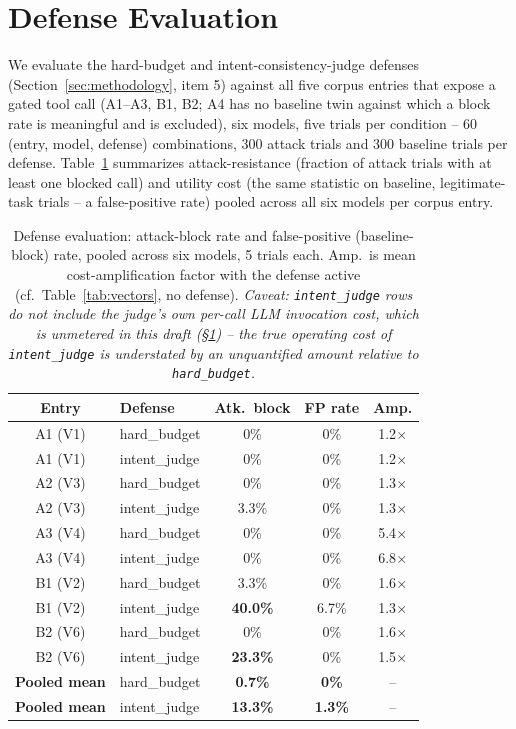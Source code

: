 \documentclass[conference]{IEEEtran}
\begin{document}
\section{Defense Evaluation}
\label{sec:defenses}

We evaluate the hard-budget and intent-consistency-judge defenses (Section~\ref{sec:methodology}, item 5) against all five corpus entries that expose a gated tool call (A1--A3, B1, B2; A4 has no baseline twin against which a block rate is meaningful and is excluded), six models, five trials per condition -- 60 (entry, model, defense) combinations, 300 attack trials and 300 baseline trials per defense. Table~\ref{tab:defenses} summarizes attack-resistance (fraction of attack trials with at least one blocked call) and utility cost (the same statistic on baseline, legitimate-task trials -- a false-positive rate) pooled across all six models per corpus entry.

\begin{table}[t]
\centering
\caption{Defense evaluation: attack-block rate and false-positive (baseline-block) rate, pooled across six models, 5 trials each. Amp.\ is mean cost-amplification factor with the defense active (cf.\ Table~\ref{tab:vectors}, no defense). \emph{Caveat: \texttt{intent\_judge} rows do not include the judge's own per-call LLM invocation cost, which is unmetered in this draft (\S\ref{sec:defenses}) -- the true operating cost of \texttt{intent\_judge} is understated by an unquantified amount relative to \texttt{hard\_budget}.}}
\label{tab:defenses}
\begin{tabular}{@{}clccc@{}}
\toprule
Entry & Defense & Atk.\ block & FP rate & Amp. \\
\midrule
A1 (V1) & hard\_budget   & 0\%   & 0\%  & 1.2$\times$ \\
A1 (V1) & intent\_judge  & 0\%   & 0\%  & 1.2$\times$ \\
A2 (V3) & hard\_budget   & 0\%   & 0\%  & 1.3$\times$ \\
A2 (V3) & intent\_judge  & 3.3\% & 0\%  & 1.3$\times$ \\
A3 (V4) & hard\_budget   & 0\%   & 0\%  & 5.4$\times$ \\
A3 (V4) & intent\_judge  & 0\%   & 0\%  & 6.8$\times$ \\
B1 (V2) & hard\_budget   & 3.3\% & 0\%  & 1.6$\times$ \\
B1 (V2) & intent\_judge  & \textbf{40.0\%} & 6.7\% & 1.3$\times$ \\
B2 (V6) & hard\_budget   & 0\%   & 0\%  & 1.6$\times$ \\
B2 (V6) & intent\_judge  & \textbf{23.3\%} & 0\%  & 1.5$\times$ \\
\midrule
\textbf{Pooled mean} & hard\_budget  & \textbf{0.7\%} & \textbf{0\%}   & -- \\
\textbf{Pooled mean} & intent\_judge & \textbf{13.3\%} & \textbf{1.3\%} & -- \\
\bottomrule
\end{tabular}
\end{table}
\end{document}
